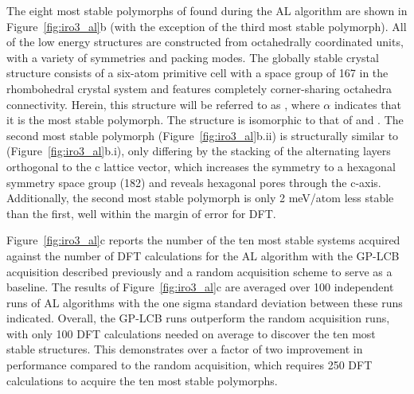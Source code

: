%
The eight most stable polymorphs of \IrOthree found during the AL algorithm are shown in Figure~\ref{fig:iro3_al}b (with the exception of the third most stable polymorph).
%
All of the low energy \IrOthree structures are constructed from octahedrally coordinated units, with a variety of symmetries and packing modes.
%
The globally stable crystal structure consists of a six-atom primitive cell with a space group of 167 in the rhombohedral crystal system and features completely corner-sharing octahedra connectivity.
%
Herein, this structure will be referred to as \aIrOthree, where $\alpha$ indicates that it is the most stable \IrOthree polymorph.
%
The structure is isomorphic to that of  and .
%
The second most stable polymorph
(Figure~\ref{fig:iro3_al}b.ii)
is structurally similar to
\aIrOthree (Figure~\ref{fig:iro3_al}b.i),
only differing by the stacking of the alternating layers orthogonal to the c lattice vector,
which increases the symmetry to a hexagonal symmetry space group (182) and reveals hexagonal pores through the c-axis.
%
Additionally, the second most stable polymorph is only 2 meV/atom less stable than the first, well within the margin of error for DFT.


%
%
Figure~\ref{fig:iro3_al}c reports the number of the ten most stable systems acquired against the number of DFT calculations for the AL algorithm with the GP-LCB acquisition described previously and a random acquisition scheme to serve as a baseline.
%
The results of Figure~\ref{fig:iro3_al}c are averaged over 100 independent runs of AL algorithms with the one sigma standard deviation between these runs indicated.
%
Overall, the GP-LCB runs outperform the random acquisition runs, with only \num{100} DFT calculations needed on average to discover the ten most stable structures.
%
This demonstrates over a factor of two improvement in performance compared to the random acquisition, which requires \mytilde\num{250} DFT calculations to acquire the ten most stable polymorphs.


